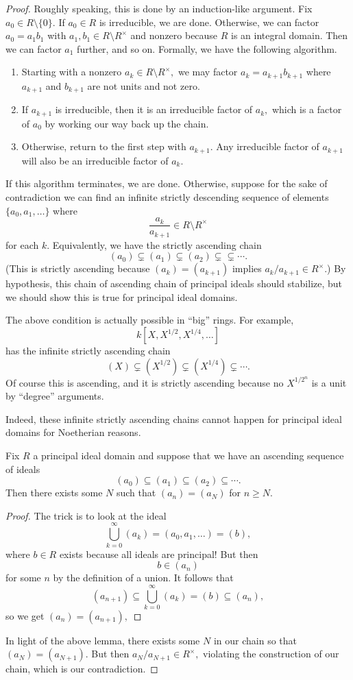 \documentclass[../notes.tex]{subfiles}
\begin{document}
\begin{proof}
	Roughly speaking, this is done by an induction-like argument. Fix $a_0\in R\setminus\{0\}.$ If $a_0\in R$ is irreducible, we are done. Otherwise, we can factor $a_0=a_1b_1$ with $a_1,b_1\in R\setminus R^\times$ and nonzero because $R$ is an integral domain. Then we can factor $a_1$ further, and so on. Formally, we have the following algorithm.
	\begin{enumerate}
		\item Starting with a nonzero $a_k\in R\setminus R^\times,$ we may factor $a_k=a_{k+1}b_{k+1}$ where $a_{k+1}$ and $b_{k+1}$ are not units and not zero.
		\item If $a_{k+1}$ is irreducible, then it is an irreducible factor of $a_k,$ which is a factor of $a_0$ by working our way back up the chain.
		\item Otherwise, return to the first step with $a_{k+1}.$ Any irreducible factor of $a_{k+1}$ will also be an irreducible factor of $a_k.$
	\end{enumerate}

	If this algorithm terminates, we are done. Otherwise, suppose for the sake of contradiction we can find an infinite strictly descending sequence of elements $\{a_0,a_1,\ldots\}$ where
	\[\frac{a_k}{a_{k+1}}\in R\setminus R^\times\]
	for each $k.$ Equivalently, we have the strictly ascending chain
	\[(a_0)\subsetneq(a_1)\subsetneq(a_2)\subsetneq\subsetneq\cdots.\]
	(This is strictly ascending because $(a_k)=(a_{k+1})$ implies $a_k/a_{k+1}\in R^\times.$) By hypothesis, this chain of ascending chain of principal ideals should stabilize, but we should show this is true for principal ideal domains.
	\begin{remark}
		The above condition is actually possible in ``big'' rings. For example,
		\[k\left[X,X^{1/2},X^{1/4},\ldots\right]\]
		has the infinite strictly ascending chain
		\[(X)\subsetneq\left(X^{1/2}\right)\subsetneq\left(X^{1/4}\right)\subsetneq\cdots.\]
		Of course this is ascending, and it is strictly ascending because no $X^{1/2^n}$ is a unit by ``degree'' arguments.
	\end{remark}
	Indeed, these infinite strictly ascending chains cannot happen for principal ideal domains for Noetherian reasons.
	\begin{lemma}
		Fix $R$ a principal ideal domain and suppose that we have an ascending sequence of ideals
		\[(a_0)\subseteq(a_1)\subseteq(a_2)\subseteq\cdots.\]
		Then there exists some $N$ such that $(a_n)=(a_N)$ for $n\ge N.$
	\end{lemma}
	\begin{proof}
		The trick is to look at the ideal
		\[\bigcup_{k=0}^\infty(a_k)=(a_0,a_1,\ldots)=(b),\]
		where $b\in R$ exists because all ideals are principal! But then
		\[b\in (a_n)\]
		for some $n$ by the definition of a union. It follows that
		\[(a_{n+1})\subseteq\bigcup_{k=0}^\infty(a_k)=(b)\subseteq(a_n),\]
		so we get $(a_n)=(a_{n+1}),$ 
	\end{proof}
	In light of the above lemma, there exists some $N$ in our chain so that $(a_N)=(a_{N+1}).$ But then $a_N/a_{N+1}\in R^\times,$ violating the construction of our chain, which is our contradiction.
\end{proof}
\end{document}
